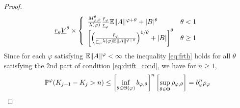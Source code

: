 \documentclass[aoas,preprint]{imsart}
\numberwithin{equation}{section}
\theoremstyle{plain}
\begin{document}
\begin{proof}
\[{    \underline r_{\theta} \underline V^\theta
  } \times \left\{
  \begin{array}{ll}
    {M_{\varphi, \theta}^\theta \over \lambda(\varphi)}
    {\bar r_\varphi \over \underline r_\varphi}
    \E \|A\|^{\varphi + \theta} + |B|^\theta
    &
    \theta < 1
    \\
    \left[
    \left(
      {\bar r_\varphi} \over \underline r_\varphi \lambda(\varphi)
      \E \|A\|^{\varphi + \theta}
      \right)^{1/\theta}
    + |B|
    \right]^\theta
    &
    \theta \geq 1
  \end{array}
  \right.
  \]
  Since for each $\varphi$ satisfying $\E \|A\|^\varphi < \infty$
  the inequality \eqref{eq:frth} holds for all $\theta$ satisfying
  the 2nd part of condition \eqref{eq:drift_cond},
  we have for $n \geq 1$,
  \[
  \P^\varphi (K_{j+1} - K_j> n)
  \leq
  \left[
    \inf_{\theta \in \Theta(\varphi)}
    b_{\varphi, \theta}
    \right]^n
  \left[
    \sup_{\theta \in \Theta} \rho_{\varphi, \theta}
    \right]
  = b_\varphi^n \rho_\varphi
  \]
\end{proof}
\end{document}
